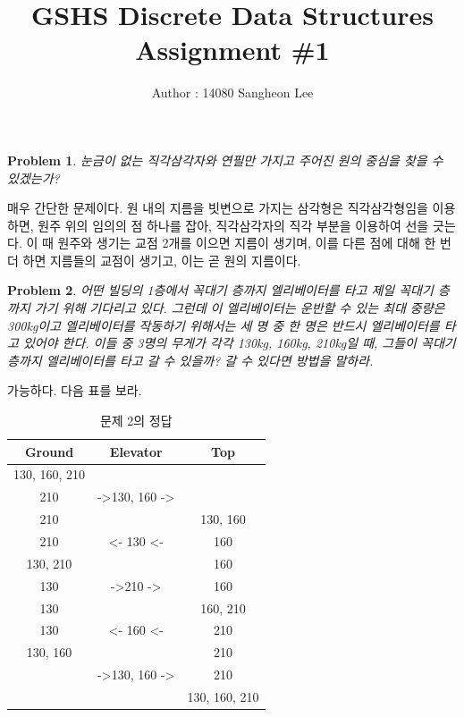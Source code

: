 \documentclass[a4paper,10pt]{article}
\newtheorem{prob}{Problem}
\begin{document}
\title{GSHS Discrete Data Structures Assignment \#1}
\author{Author : 14080 Sangheon Lee}
\date{}
\maketitle
\begin{prob}
	눈금이 없는 직각삼각자와 연필만 가지고 주어진 원의 중심을 찾을 수 있겠는가?
\end{prob}
매우 간단한 문제이다. 원 내의 지름을 빗변으로 가지는 삼각형은 직각삼각형임을 이용하면, 원주 위의 임의의 점 하나를 잡아, 직각삼각자의 직각 부분을 이용하여 선을 긋는다. 이 때 원주와 생기는 교점 2개를 이으면 지름이 생기며, 이를 다른 점에 대해 한 번 더 하면 지름들의 교점이 생기고, 이는 곧 원의 지름이다.\\
\begin{prob}
	어떤 빌딩의 1층에서 꼭대기 층까지 엘리베이터를 타고 제일 꼭대기 층까지 가기 위해 기다리고 있다. 그런데 이 엘리베이터는 운반할 수 있는 최대 중량은 300kg이고 엘리베이터를 작동하기 위해서는 세 명 중 한 명은 반드시 엘리베이터를 타고 있어야 한다. 이들 중 3명의 무게가 각각 130kg, 160kg, 210kg일 때, 그들이 꼭대기 층까지 엘리베이터를 타고 갈 수 있을까? 갈 수 있다면 방법을 말하라.
\end{prob}
가능하다. 다음 표를 보라.
\begin{table}[H]
	\centering
	
	\label{my-label}
	\begin{tabular}{|c|c|c|}
		\hline
		Ground        & Elevator                             & Top           \\ \hline
		130, 160, 210 &                                      &               \\ \hline
		210           & -\textgreater 130, 160 -\textgreater &               \\ \hline
		210           &                                      & 130, 160      \\ \hline
		210           & \textless- 130 \textless-            & 160           \\ \hline
		130, 210      &                                      & 160           \\ \hline
		130           & -\textgreater 210 -\textgreater      & 160           \\ \hline
		130           &                                      & 160, 210      \\ \hline
		130           & \textless- 160 \textless-            & 210           \\ \hline
		130, 160      &                                      & 210           \\ \hline
		& -\textgreater 130, 160 -\textgreater & 210           \\ \hline
		&                                      & 130, 160, 210 \\ \hline
	\end{tabular}
	\caption{문제 2의 정답}
\end{table}
\end{document}
